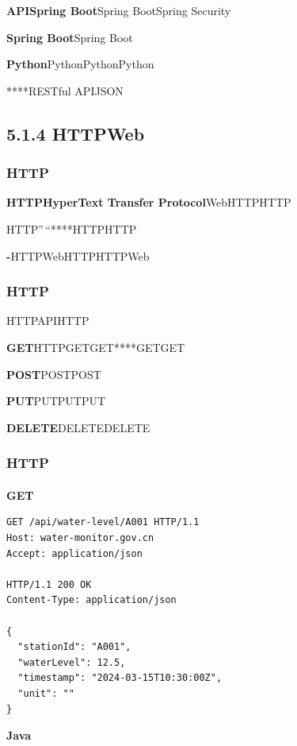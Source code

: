 \textbf{APISpring Boot}Spring BootSpring Security

\textbf{Spring Boot}Spring Boot

\textbf{Python}PythonPythonPython

****RESTful APIJSON

\subsection{5.1.4 HTTPWeb}\label{httpweb}

\subsubsection{HTTP}\label{http}

\textbf{HTTPHyperText Transfer Protocol}WebHTTPHTTP

HTTP''\,``****HTTPHTTP

\textbf{-}HTTPWebHTTPHTTPWeb

\subsubsection{HTTP}\label{http-1}

HTTPAPIHTTP

\textbf{GET}HTTPGETGET****GETGET

\textbf{POST}POSTPOST

\textbf{PUT}PUTPUTPUT

\textbf{DELETE}DELETEDELETE

\subsubsection{HTTP}\label{http-2}

\paragraph{}\label{section-17}

\textbf{GET}

\begin{verbatim}
GET /api/water-level/A001 HTTP/1.1
Host: water-monitor.gov.cn
Accept: application/json

HTTP/1.1 200 OK
Content-Type: application/json

{
  "stationId": "A001",
  "waterLevel": 12.5,
  "timestamp": "2024-03-15T10:30:00Z",
  "unit": ""
}
\end{verbatim}

\textbf{Java}

